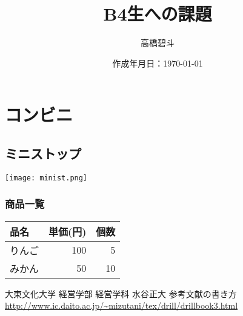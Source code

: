 \documentclass{jarticle}
\title{B4生への課題}
\author{高橋碧斗}
\date{作成年月日：\today}
\begin{document}

\maketitle

\section{コンビニ}%


\subsection{ミニストップ}%
\texttt{[image: minist.png]}

\subsubsection{商品一覧}%

\begin{tabular}{lrr}\hline
   品名   & 単価(円) & 個数 \\ \hline
   りんご & 100       & 5     \\
   みかん & 50        & 10\\      \hline
\end{tabular}

\begin{thebibliography}{99}
   大東文化大学 経営学部 経営学科 水谷正大 参考文献の書き方 \\ \url{http://www.ic.daito.ac.jp/~mizutani/tex/drill/drillbook3.html}



\end{thebibliography}
\end{document}
